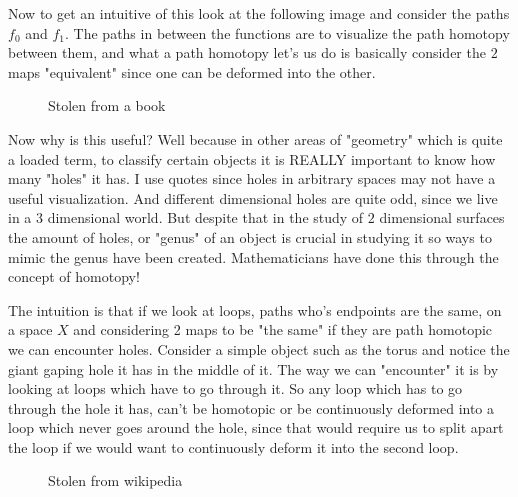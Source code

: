 \documentclass[paper=a4,fontsize=paper,12.5pt]{book}
\newcommand{\3}{\vspace*{3mm}}
\begin{document}
\3

Now to get an intuitive of this look at the following image and consider the paths ${f}_{0}$ and ${f}_{1}$. The paths in between the functions are to visualize the path homotopy between them, and what a path homotopy let's us do is basically consider the $2$ maps "equivalent" since one can be deformed into the other.

\3

{
 \begin{figure}[!hbt]
 \begin{center}
 \begin{minipage}{0.85\textwidth}
 \caption{\label{1}\small{Stolen from a book}}
 \end{minipage}
 \end{center}
 \end{figure}
 }

\3

Now why is this useful? Well because in other areas of "geometry" which is quite a loaded term, to classify certain objects it is REALLY important to know how many "holes" it has. I use quotes since holes in arbitrary spaces may not have a useful visualization. And different dimensional holes are quite odd, since we live in a $3$ dimensional world. But despite that in the study of $2$ dimensional surfaces the amount of holes, or "genus" of an object is crucial in studying it so ways to mimic the genus have been created. Mathematicians have done this through the concept of homotopy! 


\newpage

The intuition is that if we look at loops, paths who's endpoints are the same, on a space $X$ and considering 2 maps to be "the same" if they are path homotopic we can encounter holes. Consider a simple object such as the torus and notice the giant gaping hole it has in the middle of it. The way we can "encounter" it is by looking at loops which have to go through it. So any loop which has to go through the hole it has, can't be homotopic or be continuously deformed into a loop which never goes around the hole, since that would require us to split apart the loop if we would want to continuously deform it into the second loop.
\3


{
 \begin{figure}[!hbt]
 \begin{center}
 \begin{minipage}{0.85\textwidth}
 \caption{\label{torus}\small{Stolen from wikipedia}}
 \end{minipage}
 \end{center}
 \end{figure}
 }
\end{document}
